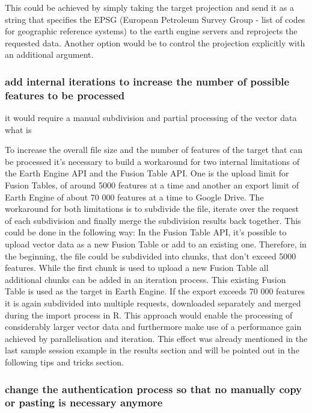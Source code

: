 \documentclass[12pt,twoside,a4paper,final]{report}
\begin{document}
 
This could be achieved by simply taking the target projection and send it as a string that specifies the EPSG (European Petroleum Survey Group - list of codes for geographic reference systems) to the earth engine servers and reprojects the requested data. Another option would be to control the projection explicitly with an additional argument.

\subsubsection{add internal iterations to increase the number of possible features to be processed}


it would require a manual subdivision and partial processing of the vector data what is 

To increase the overall file size and the number of features of the target that can be processed it's necessary to build a workaround for two internal limitations of the Earth Engine API and the Fusion Table API. One is the upload limit for Fusion Tables, of around 5000 features at a time and another an export limit of Earth Engine of about 70 000 features at a time to Google Drive. The workaround for both limitations is to subdivide the file, iterate over the request of each subdivision and finally merge the subdivision results back together. This could be done in the following way: In the Fusion Table API, it's possible to upload vector data as a new Fusion Table or add to an existing one. Therefore, in the beginning, the file could be subdivided into chunks, that don't exceed 5000 features. While the first chunk is used to upload a new Fusion Table all additional chunks can be added in an iteration process. This existing Fusion Table is used as the target in Earth Engine. If the export exceeds 70 000 features it is again subdivided into multiple requests, downloaded separately and merged during the import process in R. This approach would enable the processing of considerably larger vector data and furthermore make use of a performance gain achieved by parallelisation and iteration. This effect was already mentioned in the last sample session example in the results section and will be pointed out in the following tips and tricks section.

\subsubsection{change the authentication process so that no manually copy or pasting is necessary anymore}
\end{document}

